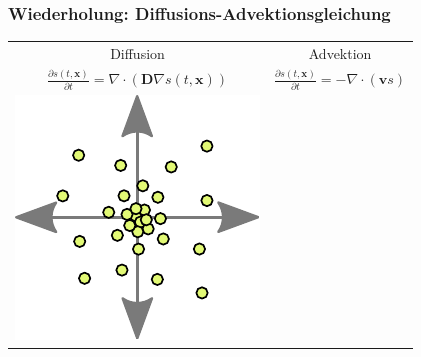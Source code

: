 \documentclass[aspectratio=32]{beamer}
\begin{document}
\begin{frame}
\frametitle{Wiederholung: Diffusions-Advektionsgleichung}

\begin{center}
\begin{tabular}{ c c }
	Diffusion & Advektion \\
	\(
		\frac{\partial s(t,\bm{x})}{\partial t} = \nabla \cdot \left( \bm{D} \nabla s(t,\bm{x}) \right)
	\)
	&
	\(
		\frac{\partial s(t,\bm{x})}{\partial t} = - \nabla \cdot (\bm{v}s)
	\)
	\\
  \includegraphics[width=\textwidth/3,keepaspectratio]{Bilder/diffusion.pdf}
	&

\end{tabular}
\end{center}
\end{frame}
\end{document}
